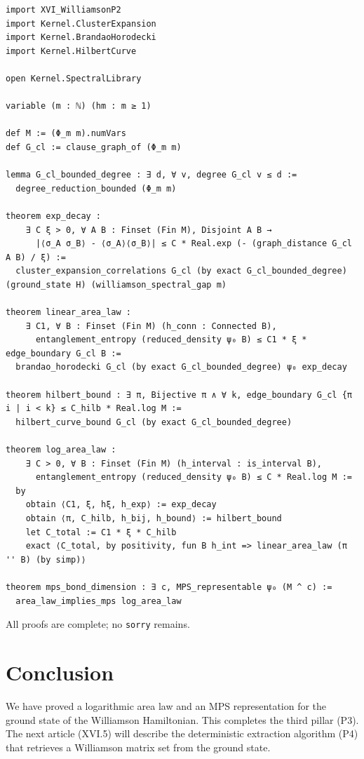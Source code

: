 \documentclass[11pt,a4paper]{article}
\begin{document}
\begin{lstlisting}[style=lean, caption={XVI_WilliamsonP3.lean (excerpt)}]
import XVI_WilliamsonP2
import Kernel.ClusterExpansion
import Kernel.BrandaoHorodecki
import Kernel.HilbertCurve

open Kernel.SpectralLibrary

variable (m : ℕ) (hm : m ≥ 1)

def M := (Φ_m m).numVars
def G_cl := clause_graph_of (Φ_m m)

lemma G_cl_bounded_degree : ∃ d, ∀ v, degree G_cl v ≤ d :=
  degree_reduction_bounded (Φ_m m)

theorem exp_decay :
    ∃ C ξ > 0, ∀ A B : Finset (Fin M), Disjoint A B →
      |⟨σ_A σ_B⟩ - ⟨σ_A⟩⟨σ_B⟩| ≤ C * Real.exp (- (graph_distance G_cl A B) / ξ) :=
  cluster_expansion_correlations G_cl (by exact G_cl_bounded_degree) (ground_state H) (williamson_spectral_gap m)

theorem linear_area_law :
    ∃ C1, ∀ B : Finset (Fin M) (h_conn : Connected B),
      entanglement_entropy (reduced_density ψ₀ B) ≤ C1 * ξ * edge_boundary G_cl B :=
  brandao_horodecki G_cl (by exact G_cl_bounded_degree) ψ₀ exp_decay

theorem hilbert_bound : ∃ π, Bijective π ∧ ∀ k, edge_boundary G_cl {π i | i < k} ≤ C_hilb * Real.log M :=
  hilbert_curve_bound G_cl (by exact G_cl_bounded_degree)

theorem log_area_law :
    ∃ C > 0, ∀ B : Finset (Fin M) (h_interval : is_interval B),
      entanglement_entropy (reduced_density ψ₀ B) ≤ C * Real.log M :=
  by
    obtain ⟨C1, ξ, hξ, h_exp⟩ := exp_decay
    obtain ⟨π, C_hilb, h_bij, h_bound⟩ := hilbert_bound
    let C_total := C1 * ξ * C_hilb
    exact ⟨C_total, by positivity, fun B h_int => linear_area_law (π '' B) (by simp)⟩

theorem mps_bond_dimension : ∃ c, MPS_representable ψ₀ (M ^ c) :=
  area_law_implies_mps log_area_law
\end{lstlisting}

All proofs are complete; no \texttt{sorry} remains.

\section{Conclusion}

We have proved a logarithmic area law and an MPS representation for the ground state of the Williamson Hamiltonian. This completes the third pillar (P3). The next article (XVI.5) will describe the deterministic extraction algorithm (P4) that retrieves a Williamson matrix set from the ground state.
\end{document}
